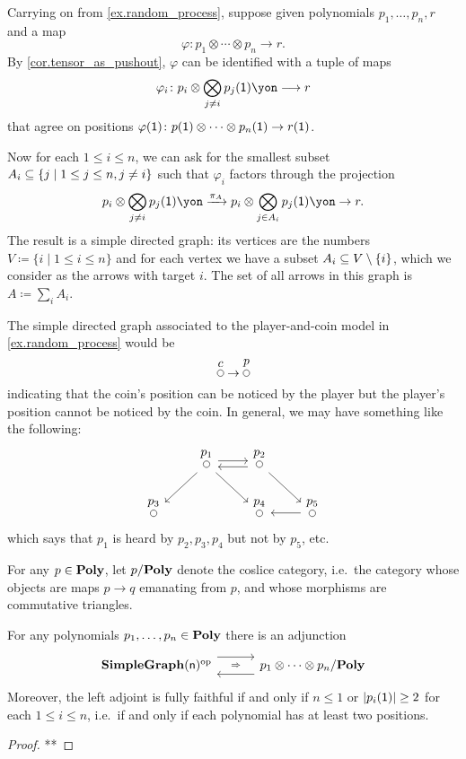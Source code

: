 \documentclass[Book-Poly]{subfiles}
\begin{document}
\begin{example}
Carrying on from \cref{ex.random_process}, suppose given polynomials $p_1,\ldots,p_n,r$ and a map
\[\varphi\colon p_1\otimes\cdots\otimes p_n\to r.\]
By \cref{cor.tensor_as_pushout}, $\varphi$ can be identified with a tuple of maps 
\[\varphi_i\colon p_i\otimes\bigotimes_{j\neq i}p_j(\1)\yon\too r\]
that agree on positions $\varphi(\1)\colon p(\1)\otimes\cdots\otimes p_n(\1)\to r(\1)$.

Now for each $1\leq i\leq n$, we can ask for the smallest subset $A_i\ss\{j\mid 1\leq j\leq n, j\neq i\}$ such that $\varphi_i$ factors through the projection
\[
	p_i\otimes\bigotimes_{j\neq i}p_j(\1)\yon\To{\pi_A}
	p_i\otimes\bigotimes_{j\in A_i}p_j(\1)\yon\to
	r.
\]
The result is a simple directed graph: its vertices are the numbers $V\coloneqq\{i\mid 1\leq i\leq n\}$ and for each vertex we have a subset $A_i\ss V\setminus \{i\}$, which we consider as the arrows with target $i$. The set of all arrows in this graph is $A\coloneqq\sum_{i}A_i$.

The simple directed graph associated to the player-and-coin model in \cref{ex.random_process} would be
\[
\LMO{c}\to\LMO{p}
\]
indicating that the coin's position can be noticed by the player but the player's position cannot be noticed by the coin. In general, we may have something like the following:
\[
\begin{tikzcd}
	&
	\LMO{p_1}\ar[dl]\ar[dr]\ar[r, shift left]&
	\LMO{p_2}\ar[l, shift left]\ar[dr]\\
	\LMO{p_3}&&
	\LMO{p_4}&
	\LMO{p_5}\ar[l]
\end{tikzcd}
\]
which says that $p_1$ is heard by $p_2,p_3,p_4$ but not by $p_5$, etc.
\end{example}

For any $p\in\poly$, let $p/\poly$ denote the coslice category, i.e.\ the category whose objects are maps $p\to q$ emanating from $p$, and whose morphisms are commutative triangles.

\begin{proposition}
For any polynomials $p_1,\ldots,p_n\in\poly$ there is an adjunction
\[
	\adj
		{\Cat{SimpleGraph}(\ord{n})\op}
		{}{}
		{p_1\otimes\cdots\otimes p_n/\poly}
\]
Moreover, the left adjoint is fully faithful if and only if $n\leq 1$ or $|p_i(\1)|\geq 2$ for each $1\leq i\leq n$, i.e.\ if and only if each polynomial has at least two positions.
\end{proposition}
\begin{proof}
**
\end{proof}
\end{document}
